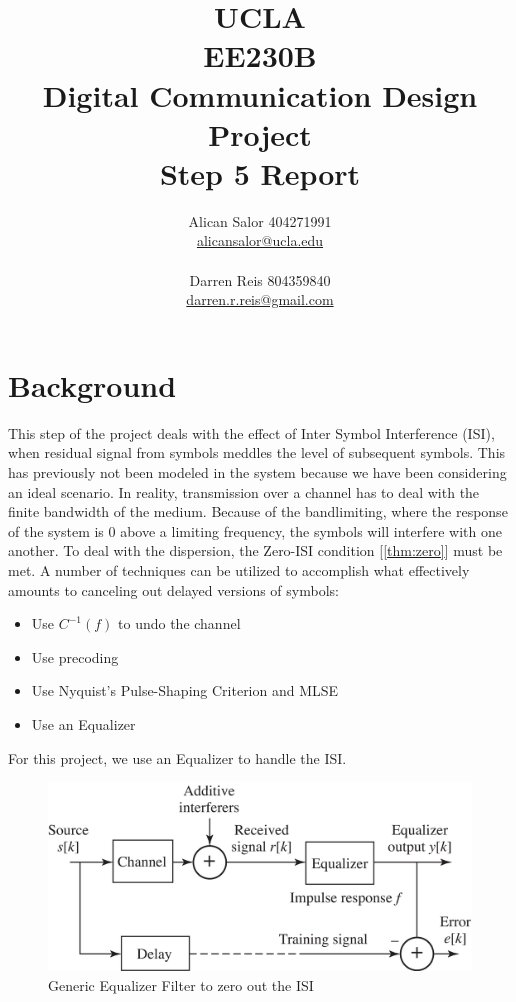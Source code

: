 \documentclass[]{article}
\title{UCLA\\EE230B\\Digital Communication Design Project\\Step 5 Report}
\author{Alican Salor 404271991 \\  \href{mailto:alicansalor@ucla.edu}{alicansalor@ucla.edu} \\ \\
Darren Reis 804359840 \\
\href{mailto:darrer.r.reis@gmail.com}{darren.r.reis@gmail.com} }
\begin{document}
\maketitle

\newpage
\tableofcontents

\newpage
\section{Background}
\label{sec:background}
This step of the project deals with the effect of Inter Symbol Interference (ISI), when residual signal from symbols meddles the level of subsequent symbols.  This has previously not been modeled in the system because we have been considering an ideal scenario.  In reality, transmission over a channel has to deal with the finite bandwidth of the medium.  Because of the bandlimiting, where the response of the system is 0 above a limiting frequency, the symbols will interfere with one another. To deal with the dispersion, the Zero-ISI condition [\ref{thm:zero}] must be met.  A number of techniques can be utilized to accomplish what effectively amounts to canceling out delayed versions of symbols:

\begin{itemize}
\item Use $C^{-1}\left(f\right)$ to undo the channel
\item Use precoding
\item Use Nyquist's Pulse-Shaping Criterion and MLSE
\item Use an Equalizer
\end{itemize}
For this project, we use an Equalizer to handle the ISI.  \\


\begin{figure}[H]
\centering
\includegraphics[width=\textwidth]{equalizer.png}
\caption{Generic Equalizer Filter to zero out the ISI\label{fig:equalizer}}
\end{figure}
\end{document}
